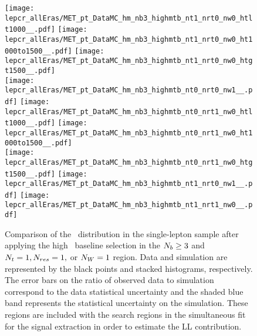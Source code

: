 \begin{figure}[!h]
	\begin{center}
  \texttt{[image: lepcr\_allEras/MET\_pt\_DataMC\_hm\_nb3\_highmtb\_nt1\_nrt0\_nw0\_htlt1000\_\_.pdf]}
  \texttt{[image: lepcr\_allEras/MET\_pt\_DataMC\_hm\_nb3\_highmtb\_nt1\_nrt0\_nw0\_ht1000to1500\_\_.pdf]} 
  \texttt{[image: lepcr\_allEras/MET\_pt\_DataMC\_hm\_nb3\_highmtb\_nt1\_nrt0\_nw0\_htgt1500\_\_.pdf]} \\
  \texttt{[image: lepcr\_allEras/MET\_pt\_DataMC\_hm\_nb3\_highmtb\_nt0\_nrt0\_nw1\_\_.pdf]} 
  \texttt{[image: lepcr\_allEras/MET\_pt\_DataMC\_hm\_nb3\_highmtb\_nt0\_nrt1\_nw0\_htlt1000\_\_.pdf]} 
  \texttt{[image: lepcr\_allEras/MET\_pt\_DataMC\_hm\_nb3\_highmtb\_nt0\_nrt1\_nw0\_ht1000to1500\_\_.pdf]} \\
  \texttt{[image: lepcr\_allEras/MET\_pt\_DataMC\_hm\_nb3\_highmtb\_nt0\_nrt1\_nw0\_htgt1500\_\_.pdf]}
  \texttt{[image: lepcr\_allEras/MET\_pt\_DataMC\_hm\_nb3\_highmtb\_nt1\_nrt0\_nw1\_\_.pdf]} 
  \texttt{[image: lepcr\_allEras/MET\_pt\_DataMC\_hm\_nb3\_highmtb\_nt1\_nrt1\_nw0\_\_.pdf]} \\
	\end{center}
	\caption[Lost Lepton HM Control Region $\nb\geq3$ with 1 heavy object]{Comparison of the \met~distribution in the single-lepton sample after applying the high \dm~baseline selection in the $\nb\geq3$ and $N_{t}=1, N_{res}=1,$ or $N_{W}=1$ region. Data and simulation are represented by the black points and stacked histograms, respectively. The error bars on the ratio of observed data to simulation correspond to the data statistical uncertainty and the shaded blue band represents the statistical uncertainty on the simulation. These regions are included with the search regions in the simultaneous fit for the signal extraction in order to estimate the LL contribution.
	 }
	\label{fig:llb-1lcr-datavsmc-hm-nb3-1}
\end{figure}